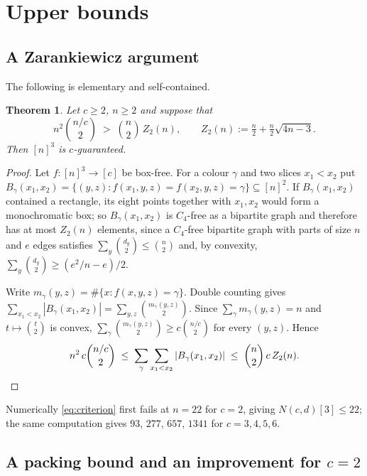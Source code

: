 \documentclass[11pt]{article}
\newtheorem{theorem}{Theorem}
\theoremstyle{definition}
\newcommand{\Ncd}{N(c,d)}
\begin{document}
\section{Upper bounds}\label{sec:upper}

\subsection{A Zarankiewicz argument}
The following is elementary and self-contained.

\begin{theorem}\label{thm:upper}
Let $c\ge2$, $n\ge2$ and suppose that
\begin{equation}\label{eq:criterion}
n^2\binom{n/c}{2}\;>\;\binom{n}{2}\,Z_2(n),
\qquad Z_2(n):=\tfrac{n}{2}+\tfrac{n}{2}\sqrt{4n-3}.
\end{equation}
Then $[n]^3$ is $c$-guaranteed.
\end{theorem}

\begin{proof}
Let $f\colon[n]^3\to[c]$ be box-free. For a colour $\gamma$ and two slices $x_1<x_2$ put
$B_\gamma(x_1,x_2)=\{(y,z): f(x_1,y,z)=f(x_2,y,z)=\gamma\}\subseteq[n]^2$. If
$B_\gamma(x_1,x_2)$ contained a rectangle, its eight points together with $x_1,x_2$ would
form a monochromatic box; so $B_\gamma(x_1,x_2)$ is $C_4$-free as a bipartite graph and
therefore has at most $Z_2(n)$ elements, since a $C_4$-free bipartite graph with parts of
size $n$ and $e$ edges satisfies $\sum_y\binom{d_y}{2}\le\binom{n}{2}$ and, by convexity,
$\sum_y\binom{d_y}{2}\ge (e^2/n-e)/2$.

Write $m_\gamma(y,z)=\#\{x: f(x,y,z)=\gamma\}$. Double counting gives
$\sum_{x_1<x_2}|B_\gamma(x_1,x_2)|=\sum_{y,z}\binom{m_\gamma(y,z)}{2}$. Since
$\sum_\gamma m_\gamma(y,z)=n$ and $t\mapsto\binom{t}{2}$ is convex,
$\sum_\gamma\binom{m_\gamma(y,z)}{2}\ge c\binom{n/c}{2}$ for every $(y,z)$. Hence
\[
n^2\,c\binom{n/c}{2}\;\le\;\sum_\gamma\sum_{x_1<x_2}|B_\gamma(x_1,x_2)|
\;\le\;\binom{n}{2}\,c\,Z_2(n). \qedhere
\]
\end{proof}

Numerically \eqref{eq:criterion} first fails at $n=22$ for $c=2$, giving
$\Ncd[3]\le22$; the same computation gives $93$, $277$, $657$, $1341$ for
$c=3,4,5,6$.

\subsection{A packing bound and an improvement for $c=2$}\label{sec:packbound}
\end{document}
